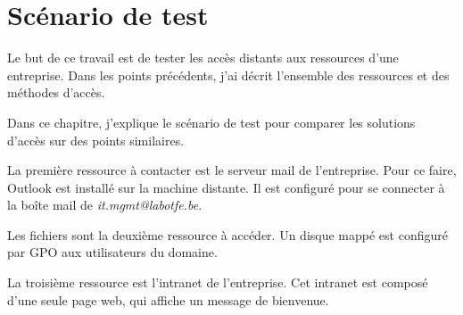 \section{Scénario de test}
Le but de ce travail est de tester les accès distants aux ressources d'une entreprise.
Dans les points précédents, j'ai décrit l'ensemble des ressources et des méthodes d'accès.

Dans ce chapitre, j'explique le scénario de test pour comparer les solutions d'accès sur des points similaires.

La première ressource à contacter est le serveur mail de l'entreprise. 
Pour ce faire, Outlook est installé sur la machine distante. 
Il est configuré pour se connecter à la boîte mail de \textit{it.mgmt@labotfe.be}.

Les fichiers sont la deuxième ressource à accéder.
Un disque mappé est configuré par GPO aux utilisateurs du domaine. 

La troisième ressource est l'intranet de l'entreprise.
Cet intranet est composé d'une seule page web, qui affiche un message de bienvenue.
